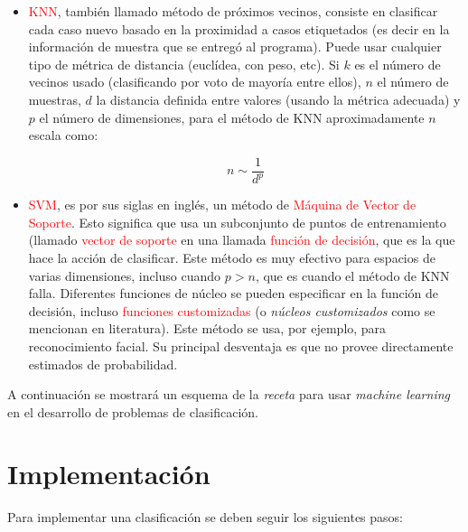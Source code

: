 \documentclass{book}
\begin{document}
\begin{itemize}
    \item \textcolor{red}{KNN}, también llamado método de próximos vecinos, consiste en clasificar cada caso nuevo basado en la proximidad a casos etiquetados (es decir en la información de muestra que se entregó al programa). Puede usar cualquier tipo de métrica de distancia (euclídea, con peso, etc). Si $k$ es el número de vecinos usado (clasificando por voto de mayoría entre ellos), $n$ el número de muestras, $d$ la distancia definida entre valores (usando la métrica adecuada) y $p$ el número de dimensiones, para el método de KNN aproximadamente $n$ escala como:
    
    \begin{equation}\label{eq12.1}n\sim\frac{1}{d^p}\end{equation}
    \item \textcolor{red}{SVM}, es por sus siglas en inglés, un método de \textcolor{red}{Máquina de Vector de Soporte}. Esto significa que usa un subconjunto de puntos de entrenamiento (llamado \textcolor{red}{vector de soporte} en una llamada \textcolor{red}{función de decisión}, que es la que hace la acción de clasificar.  Este método es muy efectivo para espacios de varias dimensiones, incluso cuando $p>n$, que es cuando el método de KNN falla. Diferentes funciones de núcleo se pueden especificar en la función de decisión, incluso \textcolor{red}{funciones customizadas} (o \textit{núcleos customizados} como se mencionan en literatura). Este método se usa, por ejemplo, para reconocimiento facial. Su principal desventaja es que no provee directamente estimados de probabilidad.  
\end{itemize}

A continuación se mostrará un esquema de la \textit{receta} para usar \textit{machine learning} en el desarrollo de problemas de clasificación.

\section{Implementación}
Para implementar una clasificación se deben seguir los siguientes pasos:
\end{document}
